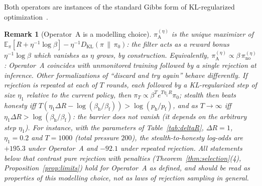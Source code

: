 \documentclass[11pt,a4paper]{article}
\newtheorem{remark}[theorem]{Remark}
\newcommand{\E}{\mathbb{E}}
\newcommand{\DKL}{D_{\mathrm{KL}}}
\begin{document}
Both operators are instances of the standard Gibbs form of KL-regularized optimization~\cite{korbak2022}.

\begin{remark}[Operator~A is a modelling choice]\label{rem:modelA}
$\pi_{\mathrm{A}}^{(\eta)}$ is the unique maximizer of $\E_{\pi}[R + \eta^{-1}\log\beta] - \eta^{-1}\DKL(\pi\,\|\,\pi_0)$: the filter acts as a reward bonus $\eta^{-1}\log\beta$ which vanishes as $\eta$ grows, by construction. Equivalently, $\pi_{\mathrm{A}}^{(\eta)} \propto \beta\,\pi_{\mathrm{no}}^{(\eta)}$: Operator~A coincides with unmonitored training followed by a single rejection at inference. Other formalizations of ``discard and try again'' behave differently. If rejection is repeated at each of $T$ rounds, each followed by a KL-regularized step of size $\eta_1$ relative to the current policy, then $\pi_T \propto \beta^T e^{T\eta_1 R}\pi_0$; stealth then beats honesty iff $T(\eta_1\Delta R - \log(\beta_{\mathrm{h}}/\beta_{\mathrm{f}})) > \log(p_{\mathrm{h}}/p_{\mathrm{f}})$, and as $T \to \infty$ iff $\eta_1\Delta R > \log(\beta_{\mathrm{h}}/\beta_{\mathrm{f}})$: the barrier does not vanish (it depends on the arbitrary step $\eta_1$). For instance, with the parameters of Table~\ref{tab:deltaR}, $\Delta R = 1$, $\eta_1 = 0.2$ and $T = 1000$ (total pressure $200$), the stealth-to-honesty log-odds are $+195.3$ under Operator~A and $-92.1$ under repeated rejection. All statements below that contrast pure rejection with penalties (Theorem~\ref{thm:selection}(4), Proposition~\ref{prop:limits}) hold for Operator~A as defined, and should be read as properties of this modelling choice, not as laws of rejection sampling in general.
\end{remark}
\end{document}
